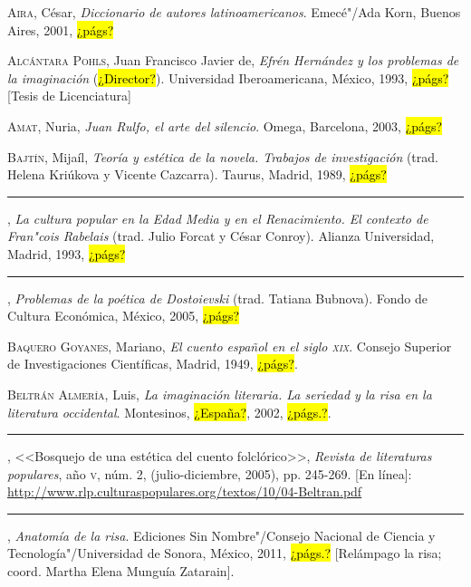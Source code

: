 \documentclass[14pt,twoside,final]{extbook} %
\begin{document}
\textsc{Aira}, César, \emph{Diccionario de autores latinoamericanos}. Emecé"/Ada Korn, Buenos Aires, 2001, \hl{¿págs?}\label{bib:aira2001}

\textsc{Alcántara Pohls}, Juan Francisco Javier de, \emph{Efrén Hernández y los problemas de la imaginación} (\hl{¿Director?}). Universidad Iberoamericana, México, 1993,  \hl{¿págs?} [Tesis de Licenciatura]\label{bib:alcantara1993}

\textsc{Amat}, Nuria, \emph{Juan Rulfo, el arte del silencio}. Omega, Barcelona, 2003, \hl{¿págs?}\label{bib:amat2003}

\textsc{Bajtín}, Mijaíl, \emph{Teoría y estética de la novela. Trabajos de investigación} (trad. Helena Kriúkova y Vicente Cazcarra). Taurus, Madrid, 1989, \hl{¿págs?}\label{bib:bajtin1989}

\rule{1cm}{0.4pt}, \emph{La cultura popular en la Edad Media y en el Renacimiento. El contexto de Fran"cois Rabelais} (trad. Julio Forcat y César Conroy). Alianza Universidad, Madrid, 1993, \hl{¿págs?}\label{bib:bajtin1993}

\rule{1cm}{0.4pt}, \emph{Problemas de la poética de Dostoievski} (trad. Tatiana Bubnova). Fondo de Cultura Económica, México, 2005, \hl{¿págs?}\label{bib:bajtin2005}

\textsc{Baquero Goyanes}, Mariano, \emph{El cuento español en el siglo \textsc{xix}}. Consejo Superior de Investigaciones Científicas, Madrid, 1949, \hl{¿págs?}.\label{bib:baquero1949}

\textsc{Beltrán Almería}, Luis, \emph{La imaginación literaria. La seriedad y la risa en la literatura occidental}. Montesinos, \hl{¿España?}, 2002, \hl{¿págs.?}.\label{bib:beltran2002}

\rule{1cm}{0.4pt}, <<Bosquejo de una estética del cuento folclórico>>, \emph{Revista de literaturas populares}, año \textsc{v}, núm. 2, (julio-diciembre, 2005), pp. 245-269. [En línea]: \url{http://www.rlp.culturaspopulares.org/textos/10/04-Beltran.pdf}\label{bib:beltran2005}

\rule{1cm}{0.4pt}, \emph{Anatomía de la risa}. Ediciones Sin Nombre"/Consejo Nacional de Ciencia y Tecnología"/Universidad de Sonora, México, 2011, \hl{¿págs.?} [Relámpago la risa; coord. Martha Elena Munguía Zatarain].\label{bib:beltran2011}
\end{document}
